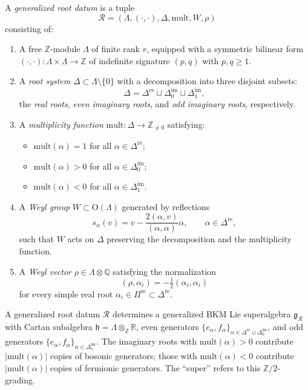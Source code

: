 \begin{definition}
\label{def:generalized-root-datum}
A \emph{generalized root datum} is a tuple
\[
 \mathcal{R} = (\Lambda, (\cdot, \cdot), \Delta, \mathrm{mult}, W, \rho)
\]
consisting of:
\begin{enumerate}[label=(\roman*)]
 \item A free $\mathbb{Z}$-module $\Lambda$ of finite rank $r$, equipped with a symmetric bilinear form $(\cdot, \cdot) \colon \Lambda \times \Lambda \to \mathbb{Z}$ of indefinite signature $(p, q)$ with $p, q \geq 1$.

 \item A \emph{root system} $\Delta \subset \Lambda \setminus \{0\}$ with a decomposition into three disjoint subsets:
 \[
 \Delta = \Delta^{\mathrm{re}} \sqcup \Delta^{\mathrm{im}}_0 \sqcup \Delta^{\mathrm{im}}_1,
 \]
 the \emph{real roots}, \emph{even imaginary roots}, and \emph{odd imaginary roots}, respectively.

 \item A \emph{multiplicity function} $\mathrm{mult} \colon \Delta \to \mathbb{Z}_{\neq 0}$ satisfying:
 \begin{itemize}
 \item $\mathrm{mult}(\alpha) = 1$ for all $\alpha \in \Delta^{\mathrm{re}}$;
 \item $\mathrm{mult}(\alpha) > 0$ for all $\alpha \in \Delta^{\mathrm{im}}_0$;
 \item $\mathrm{mult}(\alpha) < 0$ for all $\alpha \in \Delta^{\mathrm{im}}_1$.
 \end{itemize}

 \item A \emph{Weyl group} $W \subset \mathrm{O}(\Lambda)$ generated by reflections
 \[
 s_\alpha(v) = v - \frac{2(\alpha, v)}{(\alpha, \alpha)} \alpha, \qquad \alpha \in \Delta^{\mathrm{re}},
 \]
 such that $W$ acts on $\Delta$ preserving the decomposition and the multiplicity function.

 \item A \emph{Weyl vector} $\rho \in \Lambda \otimes \mathbb{Q}$ satisfying the normalization
 \[
 (\rho, \alpha_i) = -\tfrac{1}{2}(\alpha_i, \alpha_i)
 \]
 for every simple real root $\alpha_i \in \Pi^{\mathrm{re}} \subset \Delta^{\mathrm{re}}$.
\end{enumerate}
\end{definition}

\begin{remark}
\label{rem:borcherds-algebras}
A generalized root datum $\mathcal{R}$ determines a generalized BKM Lie superalgebra $\mathfrak{g}_\mathcal{R}$ with Cartan subalgebra $\mathfrak{h} = \Lambda \otimes_\mathbb{Z} \mathbb{R}$, even generators $\{e_\alpha, f_\alpha\}_{\alpha \in \Delta^{\mathrm{re}} \sqcup \Delta^{\mathrm{im}}_0}$, and odd generators $\{e_\alpha, f_\alpha\}_{\alpha \in \Delta^{\mathrm{im}}_1}$. The imaginary roots with $\mathrm{mult}(\alpha) > 0$ contribute $|\mathrm{mult}(\alpha)|$ copies of bosonic generators; those with $\mathrm{mult}(\alpha) < 0$ contribute $|\mathrm{mult}(\alpha)|$ copies of fermionic generators. The ``super'' refers to this $\mathbb{Z}/2$-grading.
\end{remark}

